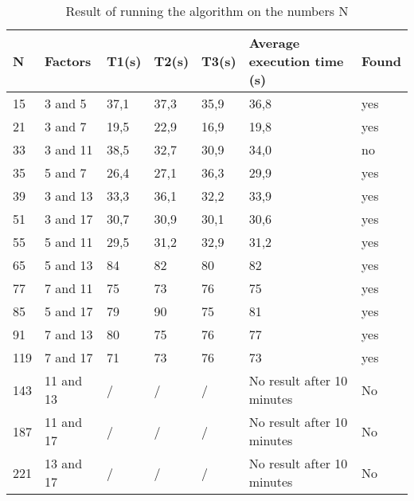 \begin{table}[h]
\label{tab:results}
    \caption{Result of running the algorithm on the numbers N}
    \begin{tabular}{|l|l|l|l|l|l|l|}
    \hline
    N   & Factors   & T1(s) & T2(s) & T3(s) & Average execution time (s)        & Found              \\ \hline
    15  & 3 and 5   & 37,1  & 37,3  & 35,9  & 36,8                              & yes                \\
    21  & 3 and 7   & 19,5  & 22,9  & 16,9  & 19,8                              & yes                \\
    33  & 3 and 11  & 38,5  & 32,7  & 30,9  & 34,0                              & no                 \\
    35  & 5 and 7   & 26,4  & 27,1  & 36,3  & 29,9                              & yes                \\
    39  & 3 and 13  & 33,3  & 36,1  & 32,2  & 33,9                              & yes                \\
    51  & 3 and 17  & 30,7  & 30,9  & 30,1  & 30,6                              & yes                \\
    55  & 5 and 11  & 29,5  & 31,2  & 32,9  & 31,2                              & yes                \\
    65  & 5 and 13  & 84    & 82    & 80    & 82                                & yes                \\
    77  & 7 and 11  & 75    & 73    & 76    & 75                                & yes                \\
    85  & 5 and 17  & 79    & 90    & 75    & 81                                & yes                \\
    91  & 7 and 13  & 80    & 75    & 76    & 77                                & yes                \\
    119 & 7 and 17  & 71    & 73    & 76    & 73                                & yes                \\
    143 & 11 and 13 & /     & /     & /     & No result after 10 minutes        & No                 \\
    187 & 11 and 17 & /     & /     & /     & No result after 10 minutes        & No                 \\
    221 & 13 and 17 & /     & /     & /     & No result after 10 minutes        & No                 \\ \hline
    \end{tabular}
\end{table}

